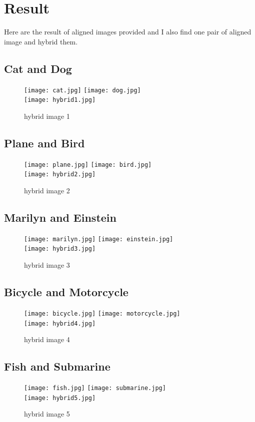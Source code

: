 \section{Result}
Here are the result of aligned images provided and I also find one pair of aligned image and hybrid them.
\subsection{Cat and Dog}
\begin{figure}[h]
	\texttt{[image: cat.jpg]}
	\texttt{[image: dog.jpg]}\\
	\texttt{[image: hybrid1.jpg]}
	\caption{hybrid image 1}
\end{figure}
\newpage
\subsection{Plane and Bird}
\begin{figure}[h]
	\texttt{[image: plane.jpg]}
	\texttt{[image: bird.jpg]}\\
	\texttt{[image: hybrid2.jpg]}
	\caption{hybrid image 2}
\end{figure}
\newpage
\subsection{Marilyn and Einstein}
\begin{figure}[h]
	\texttt{[image: marilyn.jpg]}
	\texttt{[image: einstein.jpg]}\\
	\texttt{[image: hybrid3.jpg]}
	\caption{hybrid image 3}
\end{figure}
\newpage
\subsection{Bicycle and Motorcycle}
\begin{figure}[h]
	\texttt{[image: bicycle.jpg]}
	\texttt{[image: motorcycle.jpg]}\\
	\texttt{[image: hybrid4.jpg]}
	\caption{hybrid image 4}
\end{figure}
\newpage
\subsection{Fish and Submarine}
\begin{figure}[h]
	\texttt{[image: fish.jpg]}
	\texttt{[image: submarine.jpg]}\\
	\texttt{[image: hybrid5.jpg]}
	\caption{hybrid image 5}
\end{figure}
\newpage
